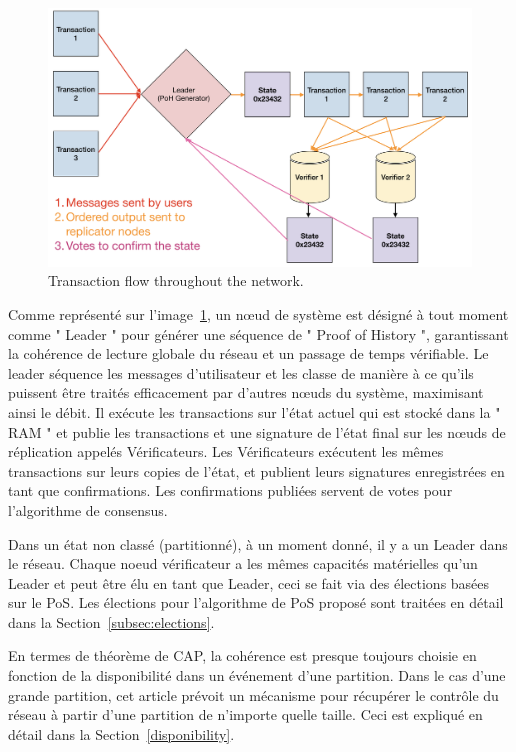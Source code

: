 \documentclass[12pt]{article}
\begin{document}
\begin{figure}[h]
  \begin{center}
    \centering
    \includegraphics[width=\textwidth]{figures/network_design_001.png}
    \caption[Fig 1]{Transaction flow throughout the network.\label{fig:design}}
  \end{center}
  \end{figure}

Comme représenté sur l’image~\ref{fig:design}, un nœud de système est désigné à tout moment comme " Leader " pour générer une séquence de " Proof of History ", garantissant la cohérence de lecture globale du réseau et un passage de temps vérifiable. Le leader séquence les messages d'utilisateur et les classe de manière à ce qu'ils puissent être traités efficacement par d'autres nœuds du système, maximisant ainsi le débit. Il exécute les transactions sur l'état actuel qui est stocké dans la " RAM " et publie les transactions et une signature de l'état final sur les nœuds de réplication appelés Vérificateurs. Les Vérificateurs exécutent les mêmes transactions sur leurs copies de l'état, et publient leurs signatures enregistrées en tant que confirmations. Les confirmations publiées servent de votes pour l'algorithme de consensus.

Dans un état non classé (partitionné), à un moment donné, il y a un Leader dans le réseau. Chaque noeud vérificateur a les mêmes capacités matérielles qu'un Leader et peut être élu en tant que Leader, ceci se fait via des élections basées sur le PoS. Les élections pour l'algorithme de PoS proposé sont traitées en détail dans la Section~\ref{subsec:elections}.

En termes de théorème de CAP, la cohérence est presque toujours choisie en fonction de la disponibilité dans un événement d'une partition. Dans le cas d'une grande partition, cet article prévoit un mécanisme pour récupérer le contrôle du réseau à partir d'une partition de n'importe quelle taille. Ceci est expliqué en détail dans la Section~\ref{disponibility}.
\end{document}
